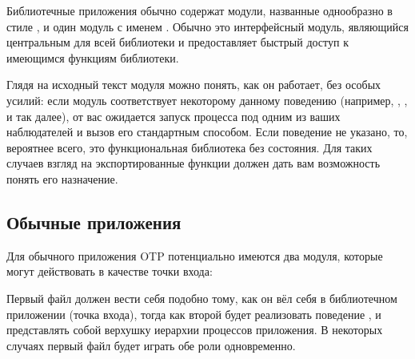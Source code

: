 \documentclass[11pt, oneside]{book}   	%
\begin{document}
Библиотечные приложения обычно содержат модули, названные однообразно в стиле , и один модуль с именем . Обычно это интерфейсный модуль, являющийся центральным для всей библиотеки и предоставляет быстрый доступ к имеющимся функциям библиотеки.

Глядя на исходный текст модуля можно понять, как он работает, без особых усилий: если модуль соответствует некоторому данному поведению (например, , , и так далее), от вас ожидается запуск процесса под одним из ваших наблюдателей и вызов его стандартным способом. Если поведение не указано, то, вероятнее всего, это функциональная библиотека без состояния. Для таких случаев взгляд на экспортированные функции должен дать вам возможность понять его назначение.


\subsection{Обычные приложения}
\label{subsec:dive-regular-applications}

Для обычного приложения OTP потенциально имеются два модуля, которые могут действовать в качестве точки входа: 

\begin{enumerate*}
	\item {}
	\item {}
\end{enumerate*}

Первый файл должен вести себя подобно тому, как он вёл себя в библиотечном приложении (точка входа), тогда как второй будет реализовать поведение , и представлять собой верхушку иерархии процессов приложения. В некоторых случаях первый файл будет играть обе роли одновременно.
\end{document}
